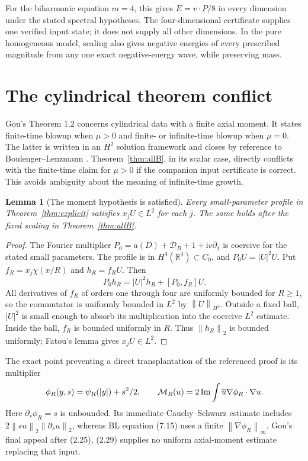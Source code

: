 \documentclass[11pt,a4paper]{article}
\newtheorem{lemma}[theorem]{Lemma}
\theoremstyle{remark}\newtheorem{remark}[theorem]{Remark}
\newcommand{\R}{\mathbb R}\newcommand{\C}{\mathbb C}
\newcommand{\ii}{\mathrm i}\newcommand{\dd}{\,\mathrm d}
\newcommand{\norm}[1]{\left\|#1\right\|}
\begin{document}
For the biharmonic equation $m=4$, this gives $E=v\cdot P/8$ in every dimension under the stated spectral hypotheses. The four-dimensional certificate supplies one verified input state; it does not supply all other dimensions. In the pure homogeneous model, scaling also gives negative energies of every prescribed magnitude from any one exact negative-energy wave, while preserving mass.

\section{The cylindrical theorem conflict}\label{sec:gou}
Gou's Theorem 1.2 \cite{Gou} concerns cylindrical data with a finite axial moment. It states finite-time blowup when $\mu>0$ and finite- or infinite-time blowup when $\mu=0$. The latter is written in an $H^2$ solution framework and closes by reference to Boulenger--Lenzmann \cite{BL}. Theorem~\ref{thm:allB}, in its scalar case, directly conflicts with the finite-time claim for $\mu>0$ if the companion input certificate is correct. This avoids ambiguity about the meaning of infinite-time growth.

\begin{lemma}[The moment hypothesis is satisfied]
Every small-parameter profile in Theorem~\ref{thm:explicit} satisfies $x_jU\in L^2$ for each $j$. The same holds after the fixed scaling in Theorem~\ref{thm:allB}.
\end{lemma}
\begin{proof}
The Fourier multiplier $P_0=a(D)+\mathcal D_B+1+\ii v\partial_1$ is coercive for the stated small parameters. The profile is in $H^4(\R^4)\subset C_0$, and $P_0U=|U|^2U$. Put $f_R=x_j\chi(x/R)$ and $h_R=f_RU$. Then
\[
 P_0h_R=|U|^2h_R+[P_0,f_R]U.
\]
All derivatives of $f_R$ of orders one through four are uniformly bounded for $R\ge1$, so the commutator is uniformly bounded in $L^2$ by $\norm U_{H^3}$. Outside a fixed ball, $|U|^2$ is small enough to absorb its multiplication into the coercive $L^2$ estimate. Inside the ball, $f_R$ is bounded uniformly in $R$. Thus $\norm{h_R}_2$ is bounded uniformly; Fatou's lemma gives $x_jU\in L^2$.
\end{proof}

The exact point preventing a direct transplantation of the referenced proof is its multiplier
\[
 \phi_R(y,s)=\psi_R(|y|)+s^2/2,\qquad
 \mathcal M_R(u)=2\operatorname{Im}\int\overline u\nabla\phi_R\cdot\nabla u.
\]
Here $\partial_s\phi_R=s$ is unbounded. Its immediate Cauchy--Schwarz estimate includes
$2\norm{su}_2\norm{\partial_su}_2$, whereas BL equation (7.15) uses a finite $\norm{\nabla\phi_R}_\infty$. Gou's final appeal after (2.25), (2.29) supplies no uniform axial-moment estimate replacing that input.
\end{document}
